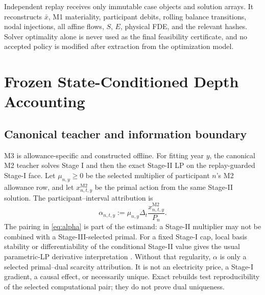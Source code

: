 \documentclass[10pt,journal]{IEEEtran}
\newcommand{\Mtwo}{\ensuremath{\mathrm{M2}}}
\begin{document}
Independent replay receives only immutable case objects and solution arrays. It reconstructs $\bar x$, M1 materiality, participant debits, rolling balance transitions, nodal injections, all affine flows, $S$, $E$, physical FDE, and the relevant hashes. Solver optimality alone is never used as the final feasibility certificate, and no accepted policy is modified after extraction from the optimization model.

\section{Frozen State-Conditioned Depth Accounting}
\label{sec:m3}

\subsection{Canonical teacher and information boundary}

M3 is allowance-specific and constructed offline. For fitting year $y$, the canonical M2 teacher solves Stage I and then the exact Stage-II LP on the replay-guarded Stage-I face. Let $\mu_{n,y}\geq0$ be the selected multiplier of participant $n$'s M2 allowance row, and let $x_{n,t,y}^{\Mtwo}$ be the primal action from the same Stage-II solution. The participant--interval attribution is
\begin{equation}
\alpha_{n,t,y}:=\mu_{n,y}\Delta_t\frac{x_{n,t,y}^{\Mtwo}}{P_n}.
\label{eq:alpha}
\end{equation}
The pairing in \eqref{eq:alpha} is part of the estimand: a Stage-II multiplier may not be combined with a Stage-III-selected primal. For a fixed Stage-I cap, local basis stability or differentiability of the conditional Stage-II value gives the usual parametric-LP derivative interpretation \cite{BonnansShapiro2000}. Without that regularity, $\alpha$ is only a selected primal--dual scarcity attribution. It is not an electricity price, a Stage-I gradient, a causal effect, or necessarily unique. Exact rebuilds test reproducibility of the selected computational pair; they do not prove dual uniqueness.
\end{document}
